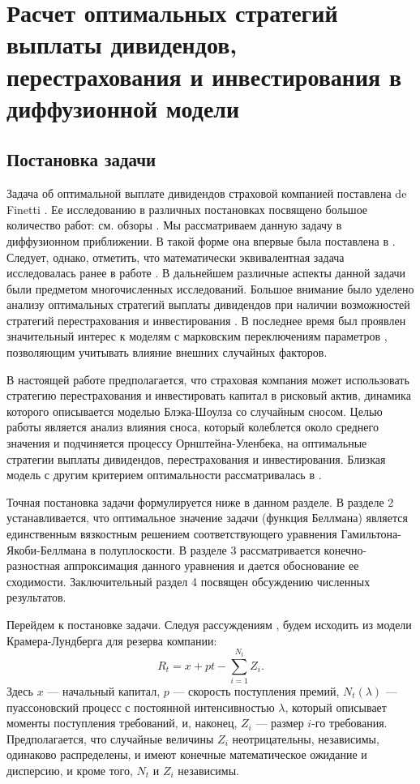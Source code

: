 \chapter{Расчет оптимальных стратегий выплаты дивидендов, перестрахования и инвестирования в диффузионной модели} \label{chapt:1}

\section{Постановка задачи} \label{sect:1.1}
Задача об оптимальной выплате дивидендов страховой компанией поставлена de Finetti \cite{DeF57}. Ее исследованию в различных постановках посвящено большое количество работ: см. обзоры \cite{Tak00, AlbTho09, Ava09}. Мы рассматриваем данную задачу в диффузионном приближении. В такой форме она впервые была поставлена в \cite{RadShe96, JeaShi95, AsmTak97}. Следует, однако, отметить, что математически эквивалентная задача исследовалась ранее в работе \cite{ShrLehGav84}.  В дальнейшем различные аспекты данной задачи были предметом многочисленных исследований. Большое внимание было уделено анализу оптимальных стратегий выплаты дивидендов при наличии возможностей стратегий перестрахования и инвестирования \cite{HogTak99, AsmHojTak00, HogTak04, CadChoTakZha06, MenSiu11, PelLae13}. В последнее время был проявлен значительный интерес к моделям с марковским переключениям параметров \cite{SotCad11, JiaPis12, ZhuChen13, Zhu14}, позволяющим учитывать влияние внешних случайных факторов.

В настоящей работе предполагается, что страховая компания может использовать стратегию перестрахования и инвестировать капитал в рисковый актив, динамика которого описывается моделью Блэка-Шоулза со случайным сносом. Целью работы является анализ влияния сноса, который колеблется около среднего значения и подчиняется процессу Орнштейна-Уленбека, на оптимальные стратегии выплаты дивидендов, перестрахования и инвестирования. Близкая модель с другим критерием оптимальности рассматривалась в \cite{LiaYueGuo11}.

Точная постановка задачи формулируется ниже в данном разделе. В разделе 2 устанавливается, что оптимальное значение задачи (функция Беллмана) является единственным вязкостным решением соответствующего уравнения Гамильтона-Якоби-Беллмана в полуплоскости. В разделе 3 рассматривается конечно-разностная аппроксимация данного уравнения и дается обоснование ее  сходимости. Заключительный раздел 4 посвящен обсуждению численных результатов.

Перейдем к постановке задачи. Следуя рассуждениям \cite{AsmHojTak00, HogTak04}, будем исходить из модели Крамера-Лундберга для резерва компании:
$$  R_t=x+pt-\sum_{i=1}^{N_t} Z_i.$$
Здесь $x$ --- начальный капитал, $p$ --- скорость поступления премий, $N_t(\lambda)$ --- пуассоновский процесс с постоянной интенсивностью $\lambda$, который описывает моменты поступления требований, и, наконец, $Z_i$ --- размер $i$-го требования. Предполагается, что случайные величины $Z_i$ неотрицательны, независимы, одинаково распределены, и имеют конечные математическое ожидание и дисперсию, и кроме того, $N_t$ и $Z_i$ независимы.

